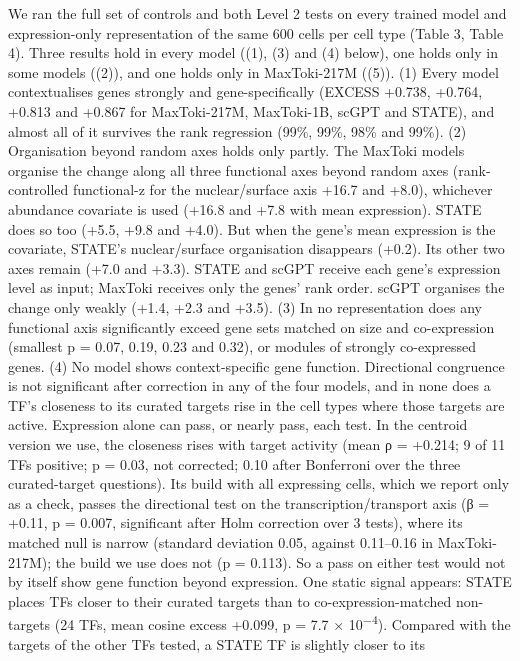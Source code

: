 \documentclass[
  11pt,
]{article}
\newcounter{none} %
\begin{document}
We ran the full set of controls and both Level 2 tests on every trained
model and expression-only representation of the same 600 cells per cell
type (Table 3, Table 4). Three results hold in every model ((1), (3) and
(4) below), one holds only in some models ((2)), and one holds only in
MaxToki-217M ((5)). (1) Every model contextualises genes strongly and
gene-specifically (EXCESS +0.738, +0.764, +0.813 and +0.867 for
MaxToki-217M, MaxToki-1B, scGPT and STATE), and almost all of it
survives the rank regression (99\%, 99\%, 98\% and 99\%). (2)
Organisation beyond random axes holds only partly. The MaxToki models
organise the change along all three functional axes beyond random axes
(rank-controlled functional-z for the nuclear/surface axis +16.7 and
+8.0), whichever abundance covariate is used (+16.8 and +7.8 with mean
expression). STATE does so too (+5.5, +9.8 and +4.0). But when the
gene's mean expression is the covariate, STATE's nuclear/surface
organisation disappears (+0.2). Its other two axes remain (+7.0 and
+3.3). STATE and scGPT receive each gene's expression level as input;
MaxToki receives only the genes' rank order. scGPT organises the change
only weakly (+1.4, +2.3 and +3.5). (3) In no representation does any
functional axis significantly exceed gene sets matched on size and
co-expression (smallest p = 0.07, 0.19, 0.23 and 0.32), or modules of
strongly co-expressed genes. (4) No model shows context-specific gene
function. Directional congruence is not significant after correction in
any of the four models, and in none does a TF's closeness to its curated
targets rise in the cell types where those targets are active.
Expression alone can pass, or nearly pass, each test. In the centroid
version we use, the closeness rises with target activity (mean ρ =
+0.214; 9 of 11 TFs positive; p = 0.03, not corrected; 0.10 after
Bonferroni over the three curated-target questions). Its build with all
expressing cells, which we report only as a check, passes the
directional test on the transcription/transport axis (β = +0.11, p =
0.007, significant after Holm correction over 3 tests), where its
matched null is narrow (standard deviation 0.05, against 0.11--0.16 in
MaxToki-217M); the build we use does not (p = 0.113). So a pass on
either test would not by itself show gene function beyond expression.
One static signal appears: STATE places TFs closer to their curated
targets than to co-expression-matched non-targets (24 TFs, mean cosine
excess +0.099, p = 7.7 × 10\textsuperscript{−4}). Compared with the
targets of the other TFs tested, a STATE TF is slightly closer to its
\end{document}
